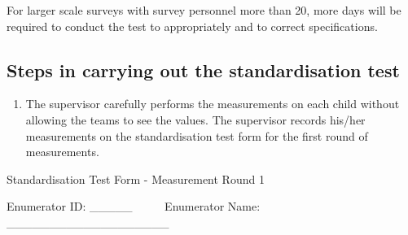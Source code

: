 \documentclass[12pt,a4paper]{book}
\providecommand{\tightlist}{%
  \setlength{\itemsep}{0pt}\setlength{\parskip}{0pt}}
\theoremstyle{definition}
\theoremstyle{definition}
\theoremstyle{definition}
\theoremstyle{remark}
\begin{document}
For larger scale surveys with survey personnel more than 20, more days
will be required to conduct the test to appropriately and to correct
specifications.

\hypertarget{steps-in-carrying-out-the-standardisation-test}{%
\subsection{Steps in carrying out the standardisation
test}\label{steps-in-carrying-out-the-standardisation-test}}

\begin{enumerate}
\def\labelenumi{\arabic{enumi}.}
\tightlist
\item
  The supervisor carefully performs the measurements on each child
  without allowing the teams to see the values. The supervisor records
  his/her measurements on the standardisation test form for the first
  round of measurements.
\end{enumerate}

Standardisation Test Form - Measurement Round 1

Enumerator ID: \_\_\_\_\_ ~ ~ ~ Enumerator Name:
\_\_\_\_\_\_\_\_\_\_\_\_\_\_\_\_\_\_\_
\end{document}
